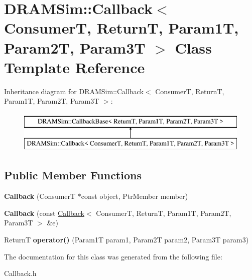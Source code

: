 \hypertarget{classDRAMSim_1_1Callback}{\section{D\-R\-A\-M\-Sim\-:\-:Callback$<$ Consumer\-T, Return\-T, Param1\-T, Param2\-T, Param3\-T $>$ Class Template Reference}
\label{classDRAMSim_1_1Callback}
}
Inheritance diagram for D\-R\-A\-M\-Sim\-:\-:Callback$<$ Consumer\-T, Return\-T, Param1\-T, Param2\-T, Param3\-T $>$\-:\begin{figure}[H]
\begin{center}
\leavevmode
\includegraphics[height=2.000000cm]{classDRAMSim_1_1Callback}
\end{center}
\end{figure}
\subsection*{Public Member Functions}
\begin{DoxyCompactItemize}
\item 
\hypertarget{classDRAMSim_1_1Callback_a9218078cc5213b32f2bdbd8f2b32156d}{{\bfseries Callback} (Consumer\-T $\ast$const object, Ptr\-Member member)}\label{classDRAMSim_1_1Callback_a9218078cc5213b32f2bdbd8f2b32156d}

\item 
\hypertarget{classDRAMSim_1_1Callback_a73b50bc52f1aa9bc3881904d53e27638}{{\bfseries Callback} (const \hyperlink{classDRAMSim_1_1Callback}{Callback}$<$ Consumer\-T, Return\-T, Param1\-T, Param2\-T, Param3\-T $>$ \&e)}\label{classDRAMSim_1_1Callback_a73b50bc52f1aa9bc3881904d53e27638}

\item 
\hypertarget{classDRAMSim_1_1Callback_a43d30eea69ef321345952a92fbfc6108}{Return\-T {\bfseries operator()} (Param1\-T param1, Param2\-T param2, Param3\-T param3)}\label{classDRAMSim_1_1Callback_a43d30eea69ef321345952a92fbfc6108}

\end{DoxyCompactItemize}


The documentation for this class was generated from the following file\-:\begin{DoxyCompactItemize}
\item 
Callback.\-h\end{DoxyCompactItemize}
